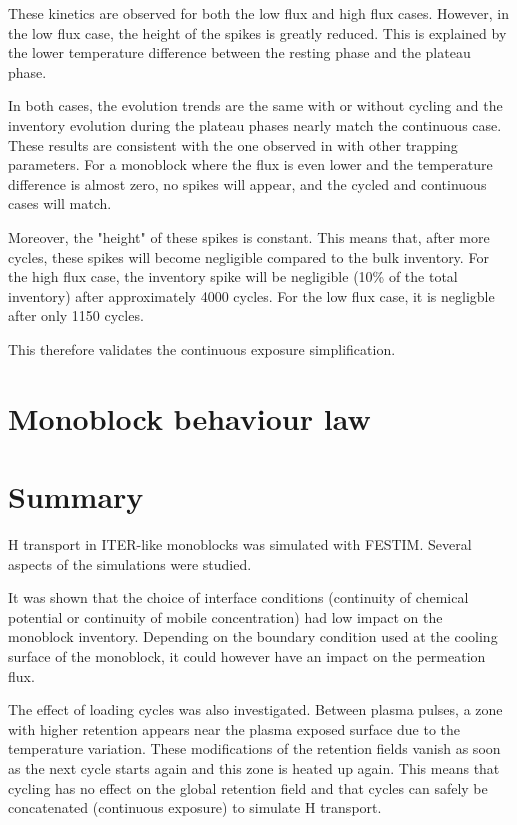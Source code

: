 These kinetics are observed for both the low flux and high flux cases.
However, in the low flux case, the height of the spikes is greatly reduced.
This is explained by the lower temperature difference between the resting phase and the plateau phase.

In both cases, the evolution trends are the same with or without cycling and the inventory evolution during the plateau phases nearly match the continuous case.
These results are consistent with the one observed in  with other trapping parameters.
For a monoblock where the flux is even lower and the temperature difference is almost zero, no spikes will appear, and the cycled and continuous cases will match.

Moreover, the "height" of these spikes is constant.
This means that, after more cycles, these spikes will become negligible compared to the bulk inventory.
For the high flux case, the inventory spike will be negligible (10\% of the total inventory) after approximately 4000 cycles.
For the low flux case, it is negligble after only 1150 cycles.

This therefore validates the continuous exposure simplification.


\section{Monoblock behaviour law} \label{influence of exposure conditions}



\section{Summary}
H transport in ITER-like monoblocks was simulated with FESTIM.
Several aspects of the simulations were studied.

It was shown that the choice of interface conditions (continuity of chemical potential or continuity of mobile concentration) had low impact on the monoblock inventory.
Depending on the boundary condition used at the cooling surface of the monoblock, it could however have an impact on the permeation flux.

The effect of loading cycles was also investigated.
Between plasma pulses, a zone with higher retention appears near the plasma exposed surface due to the temperature variation.
These modifications of the retention fields vanish as soon as the next cycle starts again and this zone is heated up again.
This means that cycling has no effect on the global retention field and that cycles can safely be concatenated (continuous exposure) to simulate H transport.

